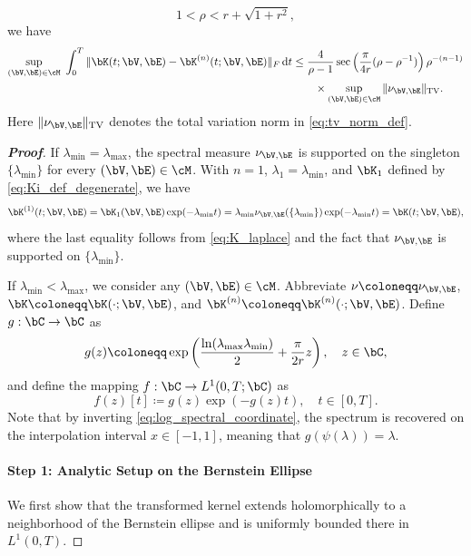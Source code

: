 \begin{lemma}
\begin{enumerate}[label=(\roman*)]
\begin{equation}
1<\rho<r+\sqrt{1+r^2},
\end{equation}
we have
\begin{align}\label{eq:kernel_error_prony}
    \sup_{(\bV,\bE)\in\cM}\ \int_0^T \|\bK(t;\bV,\bE)-\bK^{(n)}(t;\bV,\bE)\|_F\,\mathrm{d}t
&\leq
\frac{4}{\rho-1}
\sec\left(
\frac{\pi}{4r}(\rho-\rho^{-1})
\right)
\rho^{-(n-1)}\nonumber\\
&\qquad\times\sup_{(\bV,\bE)\in\cM}\|\nu_{\bV,\bE}\|_{\mathrm{TV}}.
\end{align}
Here $\|\nu_{\bV,\bE}\|_{\mathrm{TV}}$ denotes the total variation norm in \cref{eq:tv_norm_def}.
\end{enumerate}
\end{lemma}

\begin{proof}[\bf Proof]
If $\lambda_{\min}=\lambda_{\max}$, the spectral measure $\nu_{\bV,\bE}$ is supported on the singleton $\{\lambda_{\min}\}$ for every $(\bV,\bE)\in\cM$. With $n=1$, $\lambda_1=\lambda_{\min}$, and $\bK_1$ defined by \cref{eq:Ki_def_degenerate}, we have
\begin{equation*}
\bK^{(1)}(t;\bV,\bE)=\bK_1(\bV,\bE)\exp(-\lambda_{\min} t)
=\lambda_{\min}\nu_{\bV,\bE}(\{\lambda_{\min}\})\exp(-\lambda_{\min} t)=\bK(t;\bV,\bE),
\end{equation*}
where the last equality follows from \cref{eq:K_laplace} and the fact that $\nu_{\bV,\bE}$ is supported on $\{\lambda_{\min}\}$.

If $\lambda_{\min}<\lambda_{\max}$, we consider any $(\bV,\bE)\in\cM$. Abbreviate $\nu\coloneqq\nu_{\bV,\bE}$, $\bK\coloneqq\bK(\cdot;\bV,\bE)$, and $\bK^{(n)}\coloneqq\bK^{(n)}(\cdot;\bV,\bE)$. Define $g:\bC\to \bC$ as
\begin{equation*}
g(z)\coloneqq
\exp\left(
\frac{\ln(\lambda_{\max}\lambda_{\min})}{2}
+\frac{\pi}{2r}z
\right),
\quad z\in\bC,
\end{equation*}
and define the mapping $f:\bC\to L^1(0,T;\bC)$ as
\begin{equation*}
f(z)[t]\coloneqq g(z)\exp(-g(z)t),
\quad t\in[0,T].
\end{equation*}
Note that by inverting \cref{eq:log_spectral_coordinate}, the spectrum is recovered on the interpolation interval $x\in[-1,1]$, meaning that $g(\psi(\lambda)) = \lambda$.

\paragraph{Step 1: Analytic Setup on the Bernstein Ellipse}
We first show that the transformed kernel extends holomorphically to a neighborhood of the Bernstein ellipse and is uniformly bounded there in $L^1(0,T)$.


\end{proof}
